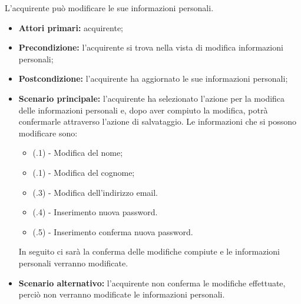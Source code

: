 
L'acquirente può modificare le sue informazioni personali.
\begin{itemize}
    \item \textbf{Attori primari:} acquirente;
    \item \textbf{Precondizione:} l'acquirente si trova nella vista di modifica informazioni personali;
    \item \textbf{Postcondizione:} l'acquirente ha aggiornato le sue informazioni personali;
    \item \textbf{Scenario principale:} l'acquirente ha selezionato l'azione per la modifica delle informazioni personali e, dopo aver compiuto la modifica, potrà confermarle attraverso l'azione di salvataggio. Le informazioni che si possono modificare sono:
    \begin{itemize}
        \item (\actualUC.1) - Modifica del nome;
        \item (\actualUC.1) - Modifica del cognome;
        \item (\actualUC.3) - Modifica dell'indirizzo email.
        \item (\actualUC.4) - Inserimento nuova password.
        \item (\actualUC.5) - Inserimento conferma nuova password.
    \end{itemize}
    In seguito ci sarà la conferma delle modifiche compiute e le informazioni personali verranno modificate.
    \item \textbf{Scenario alternativo:} l'acquirente non conferma le modifiche effettuate, perciò non verranno modificate le informazioni personali.
\end{itemize}

\resetSubUC

